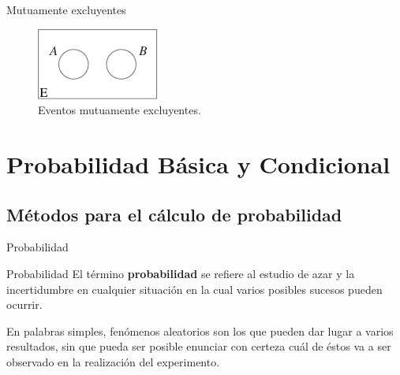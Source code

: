 \documentclass[11pt]{beamer}
\begin{document}
        \begin{frame}{Mutuamente excluyentes}
        \begin{figure}
            \centering
            \includegraphics[width=0.7\linewidth]{images/estadistica5}
            \caption{Eventos mutuamente
excluyentes.}
            \label{fig:estadistica5}
        \end{figure}

      \end{frame}



    \section*{Probabilidad Básica y Condicional}
      \subsection*{Métodos para el cálculo de probabilidad}
        \begin{frame}{Probabilidad}
            \begin{block}{Probabilidad}
                El término \textbf{probabilidad} se refiere al estudio de azar y la incertidumbre en cualquier
                situación en la cual varios posibles sucesos pueden ocurrir.
            \end{block}

            En palabras simples, fenómenos aleatorios son los que pueden dar lugar a varios resultados, sin que pueda ser posible enunciar con certeza cuál de éstos va a ser observado en la realización del experimento.
        \end{frame}
\end{document}
